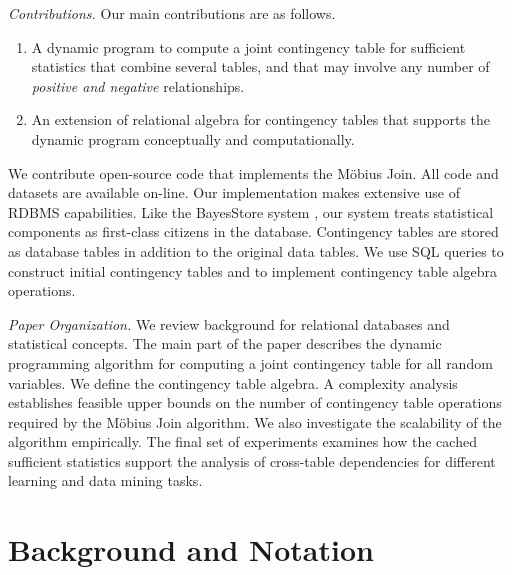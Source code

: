 \documentclass{sig-alternate-2013}
\begin{document}
\emph{Contributions.} Our main contributions 
are as follows.
\begin{enumerate}
\item A dynamic program to compute a joint contingency table for sufficient statistics that combine several tables, and that may involve any number of {\em positive and negative }relationships.
\item An extension of relational algebra for contingency tables that supports the dynamic program conceptually and computationally.
\end{enumerate}

We contribute open-source code that implements the M\"obius Join. All code and datasets are available on-line\cite{bib:jbnsite}. Our implementation makes extensive use of RDBMS capabilities. Like the BayesStore system \cite{Wang2008}, our system treats statistical components as first-class citizens in the database. Contingency tables are stored as database tables  in addition to the original data tables. We use SQL queries to construct initial contingency tables and to implement contingency table algebra operations. 

\emph{Paper Organization.} 
We review background for relational databases and statistical concepts. 
The main part of the paper describes the dynamic programming algorithm for computing a joint contingency table for all random variables. 
We define the contingency table algebra. 
A complexity analysis establishes feasible upper bounds on the number of contingency table operations required by the M\"obius Join algorithm. 
We also investigate the scalability of the algorithm empirically. 
The final set of experiments examines how the cached sufficient statistics support the analysis of cross-table dependencies for different learning and data mining tasks.


\vfill\eject
\section{Background and Notation}
\end{document}
